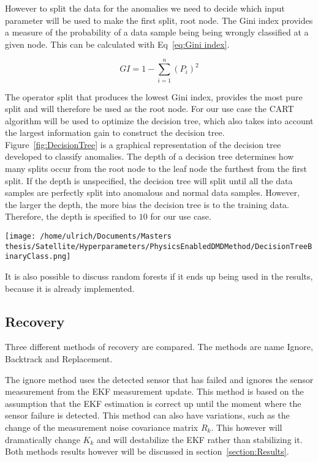 \documentclass[letterpaper, 10 pt, conference]{ieeeconf}  %
\begin{document}
However to split the data for the anomalies we need to decide which input parameter will be used to make the first split, root node. The Gini index provides a measure of the probability of a data sample being being wrongly classified at a given node. This can be calculated with Eq~\ref{eq:Gini index}.

\begin{equation}
GI = 1 - \sum_{i = 1}^{n}{(P_i)^2}
\label{eq:Gini index}
\end{equation}

The operator split that produces the lowest Gini index, provides the most pure split and will therefore be used as the root node. For our use case the CART algorithm will be used to optimize the decision tree, which also takes into account the largest information gain to construct the decision tree. Figure~\ref{fig:DecisionTree} is a graphical representation of the decision tree developed to classify anomalies. The depth of a decision tree determines how many splits occur from the root node to the leaf node the furthest from the first split. If the depth is unspecified, the decision tree will split until all the data samples are perfectly split into anomalous and normal data samples. However, the larger the depth, the more bias the decision tree is to the training data. Therefore, the depth is specified to $10$ for our use case.

\begin{figure*}[!htb]
	\centering
	\texttt{[image: /home/ulrich/Documents/Masters thesis/Satellite/Hyperparameters/PhysicsEnabledDMDMethod/DecisionTreeBinaryClass.png]}
	\label{fig:DecisionTree}
\end{figure*}

It is also possible to discuss random forests if it ends up being used in the results, because it is already implemented.


\subsection{Recovery}
Three different methods of recovery are compared. The methods are name Ignore, Backtrack and Replacement. 

The ignore method uses the detected sensor that has failed and ignores the sensor measurement from the EKF measurement update. This method is based on the assumption that the EKF estimation is correct up until the moment where the sensor failure is detected. This method can also have variations, such as the change of the measurement noise covariance matrix $R_k$. This however will dramatically change $K_k$ and will destabilize the EKF rather than stabilizing it. Both methods results however will be discussed in section~\ref{section:Results}.
\end{document}
